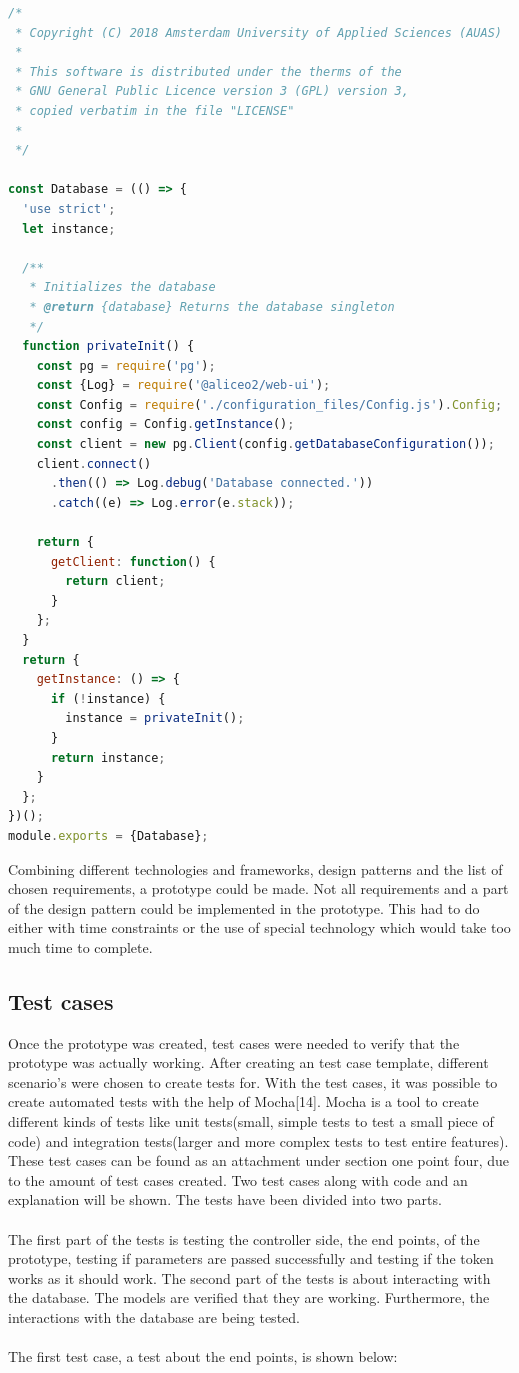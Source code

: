 \documentclass[paper=a4, fontsize=11pt,twoside]{scrartcl}	%
\begin{document}
\newpage
\begin{lstlisting}[language=JavaScript, frame=single]
/*
 * Copyright (C) 2018 Amsterdam University of Applied Sciences (AUAS)
 *
 * This software is distributed under the therms of the
 * GNU General Public Licence version 3 (GPL) version 3,
 * copied verbatim in the file "LICENSE"
 *
 */

const Database = (() => {
  'use strict';
  let instance;

  /**
   * Initializes the database
   * @return {database} Returns the database singleton
   */
  function privateInit() {
    const pg = require('pg');
    const {Log} = require('@aliceo2/web-ui');
    const Config = require('./configuration_files/Config.js').Config;
    const config = Config.getInstance();
    const client = new pg.Client(config.getDatabaseConfiguration());
    client.connect()
      .then(() => Log.debug('Database connected.'))
      .catch((e) => Log.error(e.stack));

    return {
      getClient: function() {
        return client;
      }
    };
  }
  return {
    getInstance: () => {
      if (!instance) {
        instance = privateInit();
      }
      return instance;
    }
  };
})();
module.exports = {Database};

\end{lstlisting} 

Combining different technologies and frameworks, design patterns and the list of chosen requirements, a prototype could be made. Not all requirements and a part of the design pattern could be implemented in the prototype. This had to do either with time constraints or the use of special technology which would take too much time to complete.
\newpage
\subsection{Test cases}
Once the prototype was created, test cases were needed to verify that the prototype was actually working. After creating an test case template, different scenario's were chosen to create tests for. With the test cases, it was possible to create automated tests with the help of Mocha[14]. Mocha is a tool to create different kinds of tests like unit tests(small, simple tests to test a small piece of code) and integration tests(larger and more complex tests to test entire features). These test cases can be found as an attachment under section one point four, due to the amount of test cases created. Two test cases along with code and an explanation will be shown. The tests have been divided into two parts. \\ \\
The first part of the tests is testing the controller side, the end points, of the prototype, testing if parameters are passed successfully and testing if the token works as it should work. The second part of the tests is about interacting with the database. The models are verified that they are working. Furthermore, the interactions with the database are being tested.  \\ \\
The first test case, a test about the end points, is shown below:
\end{document}
